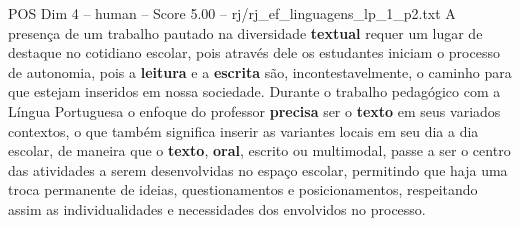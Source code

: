 \begin{textsample}{POS Dim 4 – human – Score 5.00 – rj/rj\_ef\_linguagens\_lp\_1\_p2.txt}  \label{ex:f4_pos_011}
A presença de um trabalho pautado na diversidade \textbf{textual} requer um lugar de destaque no cotidiano escolar, pois através dele os estudantes iniciam o processo de autonomia, pois a \textbf{leitura} e a \textbf{escrita} são, incontestavelmente, o caminho para que estejam inseridos em nossa sociedade.
Durante o trabalho pedagógico com a Língua Portuguesa o enfoque do professor \textbf{precisa} ser o \textbf{texto} em seus variados contextos, o que também significa inserir as variantes locais em seu dia a dia escolar, de maneira que o \textbf{texto}, \textbf{oral}, escrito ou multimodal, passe a ser o centro das atividades a serem desenvolvidas no espaço escolar, permitindo que haja uma troca permanente de ideias, questionamentos e posicionamentos, respeitando assim as individualidades e necessidades dos envolvidos no processo.

\end{textsample}
